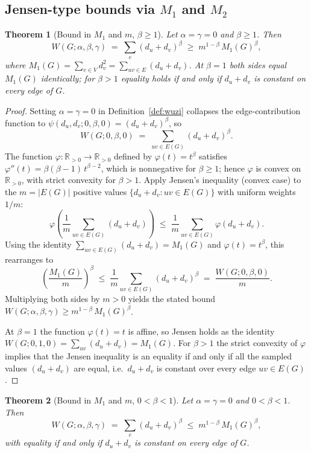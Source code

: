 \documentclass[a5paper, 10pt]{article}
\theoremstyle{plain}
\newtheorem{theorem}{Theorem}
\theoremstyle{remark}
\theoremstyle{definition}
\newcommand{\Wuzi}{W(G;\alpha,\beta,\gamma)}
\begin{document}
\subsection{Jensen-type bounds via \texorpdfstring{$M_1$ and $M_2$}{M1 and M2}}\label{sub:m1_m2}

\begin{theorem}[Bound in $M_1$ and $m$, $\beta \ge 1$]\label{thm:m1_bound}
Let $\alpha = \gamma = 0$ and $\beta \ge 1$. Then
\[
\Wuzi
\;=\; \sum_e (d_u + d_v)^{\beta}
\;\ge\; m^{1 - \beta}\, M_1(G)^{\beta},
\]
where $M_1(G) = \sum_{v \in V} d_v^2 = \sum_{uv \in E}(d_u + d_v)$.
At $\beta = 1$ both sides equal $M_1(G)$ identically; for
$\beta > 1$ equality holds if and only if $d_u + d_v$ is constant
on every edge of $G$.
\end{theorem}

\begin{proof}
Setting $\alpha = \gamma = 0$ in Definition~\ref{def:wuzi}
collapses the edge-contribution function to
$\psi(d_u, d_v; 0, \beta, 0) = (d_u + d_v)^{\beta}$, so
\[
W(G; 0, \beta, 0)
\;=\; \sum_{uv \in E(G)} (d_u + d_v)^{\beta}.
\]
The function $\varphi : \mathbb{R}_{> 0} \to \mathbb{R}_{> 0}$
defined by $\varphi(t) = t^{\beta}$ satisfies
$\varphi''(t) = \beta(\beta - 1)\, t^{\beta - 2}$, which is
nonnegative for $\beta \ge 1$; hence $\varphi$ is convex on
$\mathbb{R}_{> 0}$, with strict convexity for $\beta > 1$. Apply
Jensen's inequality (convex case) to the $m = |E(G)|$ positive
values $\{d_u + d_v : uv \in E(G)\}$ with uniform weights $1/m$:
\[
\varphi\!\left(\frac{1}{m}\sum_{uv \in E(G)} (d_u + d_v)\right)
\;\le\;
\frac{1}{m}\sum_{uv \in E(G)} \varphi(d_u + d_v).
\]
Using the identity $\sum_{uv \in E(G)} (d_u + d_v) = M_1(G)$ and
$\varphi(t) = t^{\beta}$, this rearranges to
\[
\left(\frac{M_1(G)}{m}\right)^{\!\beta}
\;\le\;
\frac{1}{m}\sum_{uv \in E(G)} (d_u + d_v)^{\beta}
\;=\;
\frac{W(G; 0, \beta, 0)}{m}.
\]
Multiplying both sides by $m > 0$ yields the stated bound
$\Wuzi \ge m^{1 - \beta}\, M_1(G)^{\beta}$.

At $\beta = 1$ the function $\varphi(t) = t$ is affine, so Jensen
holds as the identity
$W(G; 0, 1, 0) = \sum_{uv} (d_u + d_v) = M_1(G)$.
For $\beta > 1$ the strict convexity of $\varphi$ implies that
the Jensen inequality is an equality if and only if all the
sampled values $(d_u + d_v)$ are equal, i.e.\ $d_u + d_v$ is
constant over every edge $uv \in E(G)$.
\end{proof}

\begin{theorem}[Bound in $M_1$ and $m$, $0 < \beta < 1$]\label{thm:m1_concave}
Let $\alpha = \gamma = 0$ and $0 < \beta < 1$. Then
\[
\Wuzi
\;=\; \sum_e (d_u + d_v)^{\beta}
\;\le\; m^{1 - \beta}\, M_1(G)^{\beta},
\]
with equality if and only if $d_u + d_v$ is constant on every
edge of $G$.
\end{theorem}
\end{document}
